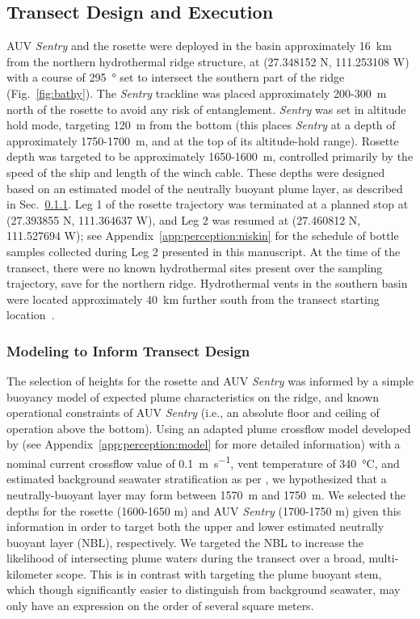 \subsection{Transect Design and Execution}
AUV \emph{Sentry} and the rosette were deployed in the basin approximately \SI{16}{\kilo\meter} from the northern hydrothermal ridge structure, at (27.348152 N, 111.253108 W) with a course of \SI{295}{\degree} set to intersect the southern part of the ridge (Fig.~\ref{fig:bathy}). The \emph{Sentry} trackline was placed approximately 200-\SI{300}{\meter} north of the rosette to avoid any risk of entanglement. \emph{Sentry} was set in altitude hold mode, targeting \SI{120}{\meter} from the bottom (this places \emph{Sentry} at a depth of approximately 1750-\SI{1700}{\meter}, and at the top of its altitude-hold range). Rosette depth was targeted to be approximately 1650-\SI{1600}{\meter}, controlled primarily by the speed of the ship and length of the winch cable. These depths were designed based on an estimated model of the neutrally buoyant plume layer, as described in Sec.~\ref{sec:model}. Leg 1 of the rosette trajectory was terminated at a planned stop at (27.393855 N, 111.364637 W), and Leg 2 was resumed at (27.460812 N, 111.527694 W); see Appendix~\ref{app:perception:niskin} for the schedule of bottle samples collected during Leg 2 presented in this manuscript. At the time of the transect, there were no known hydrothermal sites present over the sampling trajectory, save for the northern ridge. Hydrothermal vents in the southern basin were located approximately \SI{40}{\kilo\meter} further south from the transect starting location~\autocite{teske2016guaymas}.

\subsubsection{Modeling to Inform Transect Design}
\label{sec:model}
The selection of heights for the rosette and AUV \emph{Sentry} was informed by a simple buoyancy model of expected plume characteristics on the ridge, and known operational constraints of AUV \emph{Sentry} (i.e., an absolute floor and ceiling of operation above the bottom). Using an adapted plume crossflow model developed by \cite{tohidi2016highly} (see Appendix~\ref{app:perception:model} for more detailed information) with a nominal current crossflow value of \SI{0.1}{\meter\per\second}, vent temperature of \SI{340}{\celsius}, and estimated background seawater stratification as per \cite{speer1989model}, we hypothesized that a neutrally-buoyant layer may form between \SI{1570}{\meter} and \SI{1750}{\meter}. We selected the depths for the rosette (1600-1650 m) and AUV \emph{Sentry} (1700-1750 m) given this information in order to target both the upper and lower estimated neutrally buoyant layer (NBL), respectively. We targeted the NBL to increase the likelihood of intersecting plume waters during the transect over a broad, multi-kilometer scope. This is in contrast with targeting the plume buoyant stem, which though significantly easier to distinguish from background seawater, may only have an expression on the order of several square meters.

